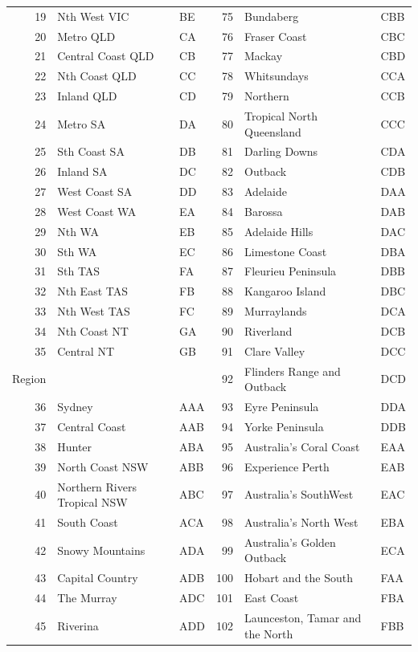 \documentclass[11pt,a4paper,]{article}
\begin{document}
\begin{longtable}[t]{rllrll}
19 & Nth West VIC & BE & 75 & Bundaberg & CBB\\
20 & Metro QLD & CA & 76 & Fraser Coast & CBC\\
21 & Central Coast QLD & CB & 77 & Mackay & CBD\\
22 & Nth Coast QLD & CC & 78 & Whitsundays & CCA\\
23 & Inland QLD & CD & 79 & Northern & CCB\\
24 & Metro SA & DA & 80 & Tropical North Queensland & CCC\\
25 & Sth Coast SA & DB & 81 & Darling Downs & CDA\\
26 & Inland SA & DC & 82 & Outback & CDB\\
27 & West Coast SA & DD & 83 & Adelaide & DAA\\
28 & West Coast WA & EA & 84 & Barossa & DAB\\
29 & Nth WA & EB & 85 & Adelaide Hills & DAC\\
30 & Sth WA & EC & 86 & Limestone Coast & DBA\\
31 & Sth TAS & FA & 87 & Fleurieu Peninsula & DBB\\
32 & Nth East TAS & FB & 88 & Kangaroo Island & DBC\\
33 & Nth West TAS & FC & 89 & Murraylands & DCA\\
34 & Nth Coast NT & GA & 90 & Riverland & DCB\\
35 & Central NT & GB & 91 & Clare Valley & DCC\\
Region &  &  & 92 & Flinders Range and Outback & DCD\\
36 & Sydney & AAA & 93 & Eyre Peninsula & DDA\\
37 & Central Coast & AAB & 94 & Yorke Peninsula & DDB\\
38 & Hunter & ABA & 95 & Australia's Coral Coast & EAA\\
39 & North Coast NSW & ABB & 96 & Experience Perth & EAB\\
40 & Northern Rivers Tropical NSW & ABC & 97 & Australia's SouthWest & EAC\\
41 & South Coast & ACA & 98 & Australia's North West & EBA\\
42 & Snowy Mountains & ADA & 99 & Australia's Golden Outback & ECA\\
43 & Capital Country & ADB & 100 & Hobart and the South & FAA\\
44 & The Murray & ADC & 101 & East Coast & FBA\\
45 & Riverina & ADD & 102 & Launceston, Tamar and the North & FBB\\

\end{longtable}
\end{document}
